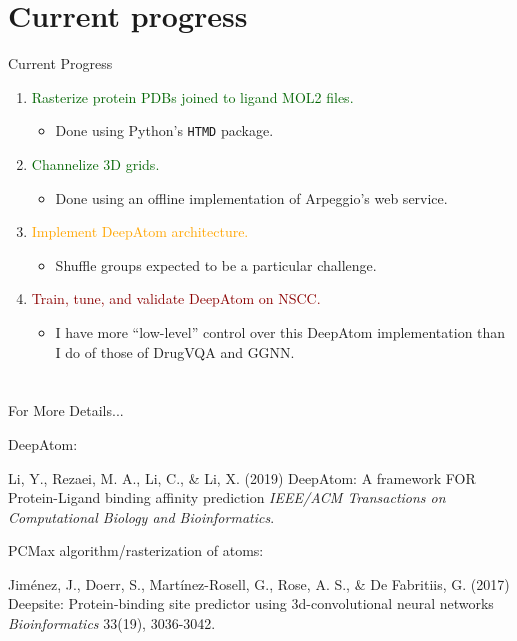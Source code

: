 \documentclass[aspectratio=169,xcolor=dvipsnames]{beamer}
\begin{document}
\section{Current progress}
\begin{frame}{Current Progress}
    \begin{enumerate}
        \item \textcolor{darkgreen}{Rasterize protein PDBs joined to ligand MOL2 files.}
        \begin{itemize}
            \item Done using Python's \texttt{HTMD} package.
        \end{itemize}
        \item \textcolor{darkgreen}{Channelize 3D grids.}
        \begin{itemize}
            \item Done using an offline implementation of Arpeggio's web service.
        \end{itemize}
        \item \textcolor{orange}{Implement DeepAtom architecture.}
        \begin{itemize}
            \item Shuffle groups expected to be a particular challenge.
        \end{itemize}
        \item \textcolor{darkred}{Train, tune, and validate DeepAtom on NSCC.}
        \begin{itemize}
            \item I have more ``low-level'' control over this DeepAtom implementation than
            I do of those of DrugVQA and GGNN.
        \end{itemize}
    \end{enumerate}
\end{frame}


\section{}
\begin{frame}{For More Details...}
    \footnotesize{
    DeepAtom:
    \begin{thebibliography}{99}
         Li, Y., Rezaei, M. A., Li, C., \& Li, X. (2019)
        \newblock DeepAtom: A framework FOR Protein-Ligand binding affinity prediction
        \newblock \emph{IEEE/ACM Transactions on Computational Biology and Bioinformatics}.
    \end{thebibliography}
    \vspace{3mm}
    PCMax algorithm/rasterization of atoms:
    \begin{thebibliography}{99}
         Jiménez, J., Doerr, S., Martínez-Rosell, G., Rose, A. S., \& De Fabritiis, G. (2017)
        \newblock Deepsite: Protein-binding site predictor using 3d-convolutional neural networks
        \newblock \emph{Bioinformatics} 33(19), 3036-3042.
    \end{thebibliography}
    }
\end{frame}
\end{document}
